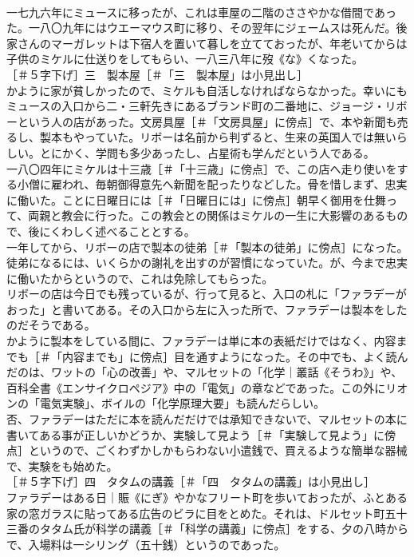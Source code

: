 \documentclass[8pt]{extreport}
\begin{document}
\begin{CJK}{UTF8}{min}
\\	一七九六年にミュースに移ったが、これは車屋の二階のささやかな借間であった。一八〇九年にはウエーマウス町に移り、その翌年にジェームスは死んだ。後家さんのマーガレットは下宿人を置いて暮しを立てておったが、年老いてからは子供のミケルに仕送りをしてもらい、一八三八年に歿《な》くなった。
\\	［＃５字下げ］三　製本屋［＃「三　製本屋」は小見出し］
\\	かように家が貧しかったので、ミケルも自活しなければならなかった。幸いにもミュースの入口から二・三軒先きにあるブランド町の二番地に、ジョージ・リボーという人の店があった。文房具屋［＃「文房具屋」に傍点］で、本や新聞も売るし、製本もやっていた。リボーは名前から判ずると、生来の英国人では無いらしい。とにかく、学問も多少あったし、占星術も学んだという人である。
\\	一八〇四年にミケルは十三歳［＃「十三歳」に傍点］で、この店へ走り使いをする小僧に雇われ、毎朝御得意先へ新聞を配ったりなどした。骨を惜しまず、忠実に働いた。ことに日曜日には［＃「日曜日には」に傍点］朝早く御用を仕舞って、両親と教会に行った。この教会との関係はミケルの一生に大影響のあるもので、後にくわしく述べることとする。
\\	一年してから、リボーの店で製本の徒弟［＃「製本の徒弟」に傍点］になった。徒弟になるには、いくらかの謝礼を出すのが習慣になっていた。が、今まで忠実に働いたからというので、これは免除してもらった。
\\	リボーの店は今日でも残っているが、行って見ると、入口の札に「ファラデーがおった」と書いてある。その入口から左に入った所で、ファラデーは製本をしたのだそうである。
\\	かように製本をしている間に、ファラデーは単に本の表紙だけではなく、内容までも［＃「内容までも」に傍点］目を通すようになった。その中でも、よく読んだのは、ワットの「心の改善」や、マルセットの「化学｜叢話《そうわ》」や、百科全書《エンサイクロペジア》中の「電気」の章などであった。この外にリオンの「電気実験」、ボイルの「化学原理大要」も読んだらしい。
\\	否、ファラデーはただに本を読んだだけでは承知できないで、マルセットの本に書いてある事が正しいかどうか、実験して見よう［＃「実験して見よう」に傍点］というので、ごくわずかしかもらわない小遣銭で、買えるような簡単な器械で、実験をも始めた。
\\	［＃５字下げ］四　タタムの講義［＃「四　タタムの講義」は小見出し］
\\	ファラデーはある日｜賑《にぎ》やかなフリート町を歩いておったが、ふとある家の窓ガラスに貼ってある広告のビラに目をとめた。それは、ドルセット町五十三番のタタム氏が科学の講義［＃「科学の講義」に傍点］をする、夕の八時からで、入場料は一シリング（五十銭）というのであった。

\end{CJK}
\end{document}
